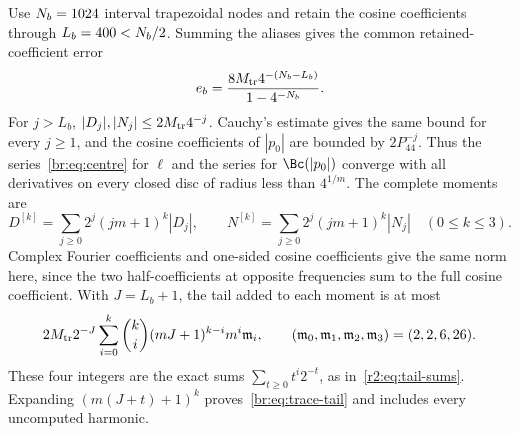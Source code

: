Use $N_b=1024$ interval trapezoidal nodes and retain the cosine
coefficients through $L_b=400<N_b/2$. Summing the aliases gives
the common retained-coefficient error
\begin{equation}\label{br:eq:trace-alias}
 e_b=\frac{8M_{\rm tr}4^{-(N_b-L_b)}}{1-4^{-N_b}}.
\end{equation}
For $j>L_b$, $|D_j|,|N_j|\le2M_{\rm tr}4^{-j}$.
Cauchy's estimate gives the same bound for every $j\ge1$, and the
cosine coefficients of $|p_0|$ are bounded by $2P_44^{-j}$. Thus the
series~\eqref{br:eq:centre} for $\ell$ and the series for $\Bc(|p_0|)$
converge with all derivatives on every closed disc of radius less than
$4^{1/m}$. The complete moments are
\begin{equation}\label{br:eq:trace-moments}
 D^{[k]}=\sum_{j\ge0}2^j(jm+1)^k|D_j|,\qquad
 N^{[k]}=\sum_{j\ge0}2^j(jm+1)^k|N_j|\quad(0\le k\le3).
\end{equation}
Complex Fourier coefficients and one-sided cosine coefficients give the
same norm here, since the two half-coefficients at opposite frequencies
sum to the full cosine coefficient. With $J=L_b+1$, the tail added to
each moment is at most
\begin{equation}\label{br:eq:trace-tail}
 2M_{\rm tr}2^{-J}\sum_{i=0}^k\binom{k}{i}
 (mJ+1)^{k-i}m^i\mathfrak m_i,
 \qquad (\mathfrak m_0,\mathfrak m_1,\mathfrak m_2,\mathfrak m_3)
 =(2,2,6,26).
\end{equation}
These four integers are the exact sums
$\sum_{t\ge0}t^i2^{-t}$, as in~\eqref{r2:eq:tail-sums}. Expanding
$(m(J+t)+1)^k$ proves~\eqref{br:eq:trace-tail} and includes every
uncomputed harmonic.

